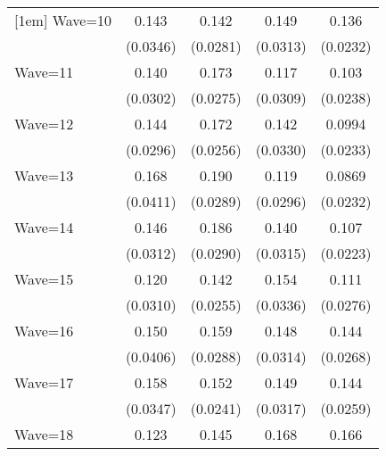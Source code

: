 {\begin{tabular}{l*{4}{c}}
[1em]
Wave=10             &       0.143\sym{***}&       0.142\sym{***}&       0.149\sym{***}&       0.136\sym{***}\\
                    &    (0.0346)         &    (0.0281)         &    (0.0313)         &    (0.0232)         \\
[1em]
Wave=11             &       0.140\sym{***}&       0.173\sym{***}&       0.117\sym{***}&       0.103\sym{***}\\
                    &    (0.0302)         &    (0.0275)         &    (0.0309)         &    (0.0238)         \\
[1em]
Wave=12             &       0.144\sym{***}&       0.172\sym{***}&       0.142\sym{***}&      0.0994\sym{***}\\
                    &    (0.0296)         &    (0.0256)         &    (0.0330)         &    (0.0233)         \\
[1em]
Wave=13             &       0.168\sym{***}&       0.190\sym{***}&       0.119\sym{***}&      0.0869\sym{***}\\
                    &    (0.0411)         &    (0.0289)         &    (0.0296)         &    (0.0232)         \\
[1em]
Wave=14             &       0.146\sym{***}&       0.186\sym{***}&       0.140\sym{***}&       0.107\sym{***}\\
                    &    (0.0312)         &    (0.0290)         &    (0.0315)         &    (0.0223)         \\
[1em]
Wave=15             &       0.120\sym{***}&       0.142\sym{***}&       0.154\sym{***}&       0.111\sym{***}\\
                    &    (0.0310)         &    (0.0255)         &    (0.0336)         &    (0.0276)         \\
[1em]
Wave=16             &       0.150\sym{***}&       0.159\sym{***}&       0.148\sym{***}&       0.144\sym{***}\\
                    &    (0.0406)         &    (0.0288)         &    (0.0314)         &    (0.0268)         \\
[1em]
Wave=17             &       0.158\sym{***}&       0.152\sym{***}&       0.149\sym{***}&       0.144\sym{***}\\
                    &    (0.0347)         &    (0.0241)         &    (0.0317)         &    (0.0259)         \\
[1em]
Wave=18             &       0.123\sym{***}&       0.145\sym{***}&       0.168\sym{***}&       0.166\sym{***}\\

\end{tabular}}
